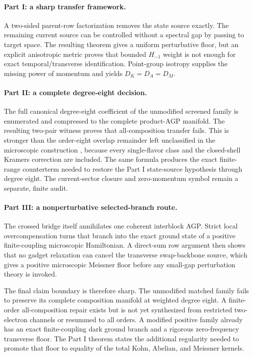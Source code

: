 \documentclass[11pt]{article}
\theoremstyle{definition}
\theoremstyle{remark}
\begin{document}
\paragraph{Part I: a sharp transfer framework.}
A two-sided parent-row factorization removes the state source exactly.  The
remaining current source can be controlled without a spectral gap by passing to
target space.  The resulting theorem gives a uniform perturbative floor, but an
explicit anisotropic metric proves that bounded $H_{-1}$ weight is not enough
for exact temporal/transverse identification.  Point-group isotropy supplies
the missing power of momentum and yields $D_K=D_A=D_M$.

\paragraph{Part II: a complete degree-eight decision.}
The full canonical degree-eight coefficient of the unmodified screened family
is enumerated and compressed to the complete product-AGP manifold.  The
resulting two-pair witness proves that all-composition transfer fails.  This is
stronger than the order-eight overlap remainder left unclassified in the
microscopic construction \cite{SledgianowskiMicro}, because every single-flavor
class and the closed-shell Kramers correction are included.  The same formula
produces the exact finite-range counterterm needed to restore the Part I
state-source hypothesis through degree eight.  The current-sector closure and
zero-momentum symbol remain a separate, finite audit.

\paragraph{Part III: a nonperturbative selected-branch route.}
The crossed bridge itself annihilates one coherent interblock AGP.  Strict local
overcompensation turns that branch into the exact ground state of a positive
finite-coupling microscopic Hamiltonian.  A direct-sum row argument then shows
that no gadget relaxation can cancel the transverse swap-backbone source,
which gives a positive microscopic Meissner floor before any small-gap
perturbation theory is invoked.

The final claim boundary is therefore sharp.  The unmodified matched family
fails to preserve its complete composition manifold at weighted degree eight.
A finite-order all-composition repair exists but is not yet synthesized from
restricted two-electron channels or resummed to all orders.  A modified
positive family already has an exact finite-coupling dark ground branch and a
rigorous zero-frequency transverse floor.  The Part I theorem states the
additional regularity needed to promote that floor to equality of the total
Kohn, Abelian, and Meissner kernels.
\end{document}
